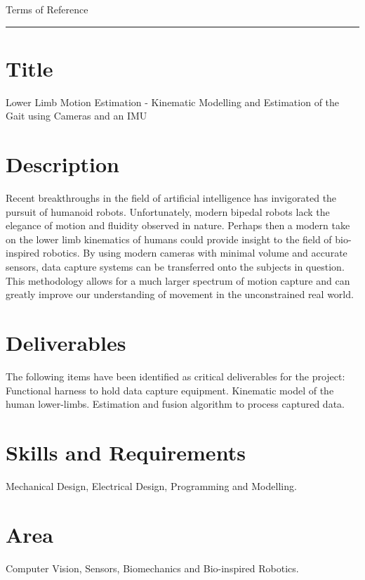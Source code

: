 \thispagestyle{plain}


{\Large Terms of Reference}\\
\hrule
\vskip 5mm

\section*{Title}
Lower Limb Motion Estimation - Kinematic Modelling and Estimation of the Gait using Cameras and an IMU
\vskip -3mm

\section*{Description}
Recent breakthroughs in the field of artificial intelligence has invigorated the pursuit of humanoid robots. Unfortunately, modern bipedal robots lack the elegance of motion and fluidity observed in nature. Perhaps then a modern take on the lower limb kinematics of humans could provide insight to the field of bio-inspired robotics. By using modern cameras with minimal volume and accurate sensors, data capture systems can be transferred onto the subjects in question. This methodology allows for a much larger spectrum of motion capture and can greatly improve our understanding of movement in the unconstrained real world.

\section*{Deliverables}
The following items have been identified as critical deliverables for the project: Functional harness to hold data capture equipment. Kinematic model of the human lower-limbs. Estimation and fusion algorithm to process captured data. 
 
\section*{Skills and Requirements}
Mechanical Design, Electrical Design, Programming and Modelling.

\section*{Area}  
Computer Vision, Sensors, Biomechanics and Bio-inspired Robotics.

